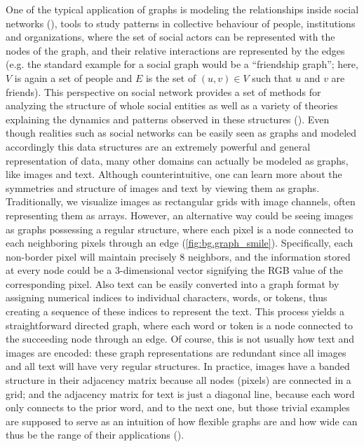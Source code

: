 \documentclass[binding=0.6cm]{sapthesis}
\newcommand{\mycite}[1]{(\cite{#1})}
\begin{document}
One of the typical application of graphs is modeling the relationships inside social networks \mycite{Wu_Lian_Xu_Wu_Chen_2020}, tools to study patterns in collective behaviour of people, institutions and organizations, where the set of social actors can be represented with the nodes of the graph, and their relative interactions are represented by the edges (e.g. the standard example for a social graph would be a “friendship graph”; here, $V$ is again a set of people and $E$ is the set of $(u, v) \in V$ such that $u$ and $v$ are friends). This perspective on social network provides a set of methods for analyzing the structure of whole social entities as well as a variety of theories explaining the dynamics and patterns observed in these structures \mycite{wasserman_faust_1994}. Even though realities such as social networks can be easily seen as graphs and modeled accordingly this data structures are an extremely powerful and general representation of data, many other domains can actually be modeled as graphs, like images and text. Although counterintuitive, one can learn more about the symmetries and structure of images and text by viewing them as graphs. 
Traditionally, we visualize images as rectangular grids with image channels, often representing them as arrays. However, an alternative way could be seeing images as graphs possessing a regular structure, where each pixel is a node connected to each neighboring pixels through an edge (\cref{fig:bg.graph_smile}). Specifically, each non-border pixel will maintain precisely 8 neighbors, and the information stored at every node could be a 3-dimensional vector signifying the RGB value of the corresponding pixel. Also text can be easily converted into a graph format by assigning numerical indices to individual characters, words, or tokens, thus creating a sequence of these indices to represent the text. This process yields a straightforward directed graph, where each word or token is a node connected to the succeeding node through an edge. Of course, this is not usually how text and images are encoded: these graph representations are redundant since all images and all text will have very regular structures. In practice, images have a banded structure in their adjacency matrix because all nodes (pixels) are connected in a grid; and the adjacency matrix for text is just a diagonal line, because each word only connects to the prior word, and to the next one, but those trivial examples are supposed to serve as an intuition of how flexible graphs are and how wide can thus be the range of their applications \mycite{distilPub-sanchez-lengeling2021a}.
\end{document}
